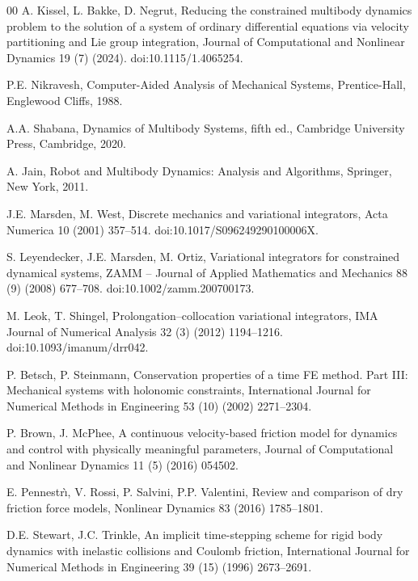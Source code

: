 \begin{thebibliography}{00}
A. Kissel, L. Bakke, D. Negrut,
Reducing the constrained multibody dynamics problem to the solution of a system of ordinary
differential equations via velocity partitioning and Lie group integration,
Journal of Computational and Nonlinear Dynamics 19 (7) (2024).
doi:10.1115/1.4065254.

P.E. Nikravesh,
Computer-Aided Analysis of Mechanical Systems, Prentice-Hall, Englewood Cliffs, 1988.

A.A. Shabana,
Dynamics of Multibody Systems, fifth ed., Cambridge University Press, Cambridge, 2020.

A. Jain,
Robot and Multibody Dynamics: Analysis and Algorithms, Springer, New York, 2011.

J.E. Marsden, M. West,
Discrete mechanics and variational integrators,
Acta Numerica 10 (2001) 357--514.
doi:10.1017/S096249290100006X.

S. Leyendecker, J.E. Marsden, M. Ortiz,
Variational integrators for constrained dynamical systems,
ZAMM -- Journal of Applied Mathematics and Mechanics 88 (9) (2008) 677--708.
doi:10.1002/zamm.200700173.

M. Leok, T. Shingel,
Prolongation--collocation variational integrators,
IMA Journal of Numerical Analysis 32 (3) (2012) 1194--1216.
doi:10.1093/imanum/drr042.

P. Betsch, P. Steinmann,
Conservation properties of a time FE method. Part III: Mechanical systems with holonomic
constraints,
International Journal for Numerical Methods in Engineering 53 (10) (2002) 2271--2304.

P. Brown, J. McPhee,
A continuous velocity-based friction model for dynamics and control with physically meaningful
parameters,
Journal of Computational and Nonlinear Dynamics 11 (5) (2016) 054502.

E. Pennestr\`{\i}, V. Rossi, P. Salvini, P.P. Valentini,
Review and comparison of dry friction force models,
Nonlinear Dynamics 83 (2016) 1785--1801.

D.E. Stewart, J.C. Trinkle,
An implicit time-stepping scheme for rigid body dynamics with inelastic collisions and Coulomb
friction,
International Journal for Numerical Methods in Engineering 39 (15) (1996) 2673--2691.


\end{thebibliography}
